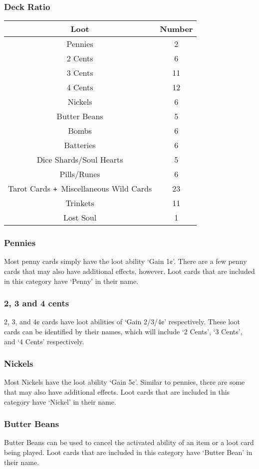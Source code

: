 \documentclass[10pt, a4paper, twoside]{article} %
\def\plus{\texttt{+}}
\begin{document}
    \subsubsection*{Deck Ratio}
    \begin{tabular}{ | c | c | }
        \hline
        \textbf{Loot} & \textbf{Number}\\
        \hline 
        Pennies & 2\\
        2 Cents & 6\\
        3 Cents & 11\\
        4 Cents & 12\\
        Nickels & 6\\
        Butter Beans & 5\\
        Bombs & 6\\
        Batteries & 6\\
        Dice Shards/Soul Hearts & 5\\
        Pills/Runes & 6\\
        Tarot Cards \plus\ Miscellaneous Wild Cards & 23\\
        Trinkets & 11\\
        Lost Soul & 1\\
        \hline
    \end{tabular}
    \subsubsection*{Pennies}
    Most penny cards simply have the loot ability ‘Gain 1¢’. There are a few penny cards that may also have additional effects, however. Loot cards that are included in this category have ‘Penny’ in their name.
    \subsubsection*{2, 3 and 4 cents}
    2, 3, and 4¢ cards have loot abilities of ‘Gain 2/3/4¢’ respectively. These loot cards can be identified by their names, which will include ‘2 Cents’, ‘3 Cents’, and ‘4 Cents’ respectively.
    \subsubsection*{Nickels}
    Most Nickels have the loot ability ‘Gain 5¢’. Similar to pennies, there are some that may also have additional effects. Loot cards that are included in this category have ‘Nickel’ in their name.
    \subsubsection*{Butter Beans}
    Butter Beans can be used to cancel the activated ability of an item or a loot card being played. Loot cards that are included in this category have ‘Butter Bean’ in their name.
\end{document}
